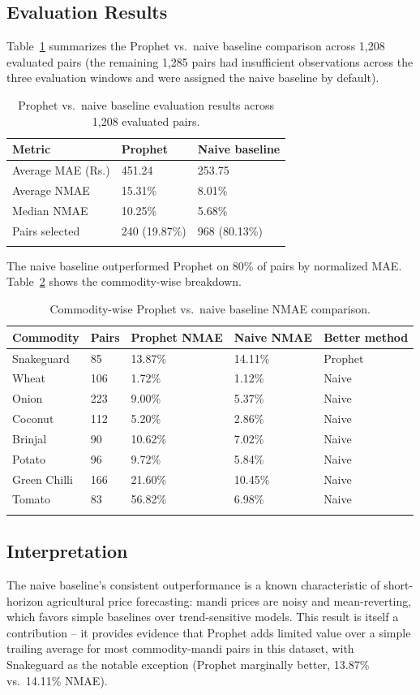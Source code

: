 \subsection{Evaluation Results}
Table~\ref{tab:evalresults} summarizes the Prophet vs.\ naive baseline
comparison across 1{,}208 evaluated pairs (the remaining 1{,}285 pairs
had insufficient observations across the three evaluation windows and
were assigned the naive baseline by default).

\begin{longtable}{@{}p{5.5cm}p{3cm}p{3cm}@{}}
\toprule
\textbf{Metric} & \textbf{Prophet} & \textbf{Naive baseline} \\
\midrule
\endhead
Average MAE (Rs.) & 451.24 & 253.75 \\
Average NMAE & 15.31\% & 8.01\% \\
Median NMAE & 10.25\% & 5.68\% \\
Pairs selected & 240 (19.87\%) & 968 (80.13\%) \\
\bottomrule
\caption{Prophet vs.\ naive baseline evaluation results across 1{,}208 evaluated pairs.}
\label{tab:evalresults}
\end{longtable}

The naive baseline outperformed Prophet on 80\% of pairs by normalized
MAE. Table~\ref{tab:commodityeval} shows the commodity-wise breakdown.

\begin{longtable}{@{}p{3.5cm}p{1.5cm}p{2.2cm}p{2.2cm}p{2.5cm}@{}}
\toprule
\textbf{Commodity} & \textbf{Pairs} & \textbf{Prophet NMAE} & \textbf{Naive NMAE} & \textbf{Better method} \\
\midrule
\endhead
Snakeguard & 85 & 13.87\% & 14.11\% & Prophet \\
Wheat & 106 & 1.72\% & 1.12\% & Naive \\
Onion & 223 & 9.00\% & 5.37\% & Naive \\
Coconut & 112 & 5.20\% & 2.86\% & Naive \\
Brinjal & 90 & 10.62\% & 7.02\% & Naive \\
Potato & 96 & 9.72\% & 5.84\% & Naive \\
Green Chilli & 166 & 21.60\% & 10.45\% & Naive \\
Tomato & 83 & 56.82\% & 6.98\% & Naive \\
\bottomrule
\caption{Commodity-wise Prophet vs.\ naive baseline NMAE comparison.}
\label{tab:commodityeval}
\end{longtable}

\subsection{Interpretation}
The naive baseline's consistent outperformance is a known characteristic
of short-horizon agricultural price forecasting: mandi prices are noisy
and mean-reverting, which favors simple baselines over trend-sensitive
models. This result is itself a contribution -- it provides evidence that
Prophet adds limited value over a simple trailing average for most
commodity-mandi pairs in this dataset, with Snakeguard as the notable
exception (Prophet marginally better, 13.87\% vs.\ 14.11\% NMAE).

